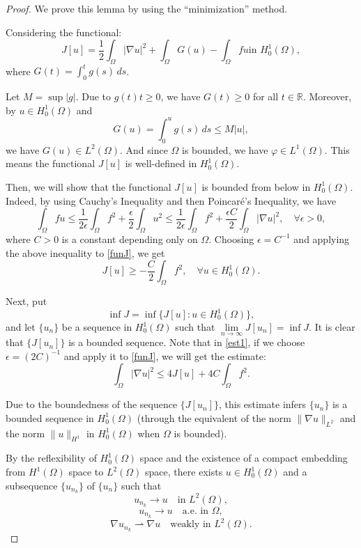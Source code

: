 \documentclass[a4paper, 11pt]{report}
\theoremstyle{definition}\newtheorem*{rmk}{Remark}
\begin{document}
\begin{proof}
We prove this lemma by using the ``minimization'' method.

Considering the functional:
\begin{equation}\label{funJ}
J[u] = \frac{1}{2} \int_{\Omega}|\nabla u|^2 + \int_{\Omega}G(u) - \int_{\Omega}fu  \text{in } H^1_0(\Omega),
\end{equation}
where $G(t) = \int_0^t g(s)\,ds$.

Let $M = \sup |g|$. Due to $g(t)t \ge 0$, we have $G(t)\ge 0$ for all $t \in \mathbb{R}$. Moreover, by $u \in H^1_0(\Omega)$ and
\[
G(u) = \int_0^u g(s)\,ds \le M|u|,
\]
we have $G(u) \in L^2(\Omega)$. And since $\Omega$ is bounded, we have $\varphi \in L^1(\Omega)$. This means the functional $J[u]$ is well-defined in $H^1_0(\Omega)$.

Then, we will show that the functional $J[u]$ is bounded from below in $H^1_0(\Omega)$. Indeed, by using Cauchy's Inequality and then Poincar\'e's Inequality, we have
\begin{equation}\label{est1}
\int_{\Omega}fu \le \frac{1}{2\epsilon}\int_{\Omega}f^2 + \frac{\epsilon}{2}\int_{\Omega}u^2 \le \frac{1}{2\epsilon}\int_{\Omega}f^2 +  \frac{\epsilon C}{2} \int_{\Omega}|\nabla u|^2, \quad \forall \epsilon > 0,
\end{equation}
where $C>0$ is a constant depending only on $\Omega$. Choosing $\epsilon = C^{-1}$ and applying the above inequality to \eqref{funJ}, we get
\[
J[u] \ge - \frac{C}{2}\int_{\Omega}f^2, \quad \forall u \in H^1_0(\Omega).
\]

Next, put
\[
\inf J = \inf \{J[u]: u\in H^1_0(\Omega)\},
\]
and let $\{ u_n\}$ be a sequence in $H^1_0(\Omega)$ such that $\lim\limits_{n\to \infty} J[u_n] = \inf J$. It is clear that $\{J[u_n]\}$ is a bounded sequence. Note that in \eqref{est1}, if we choose $\epsilon = (2C)^{-1}$ and apply it to \eqref{funJ}, we will get the estimate:
\[
\int_{\Omega}|\nabla u|^2 \le 4J[u] + 4C\int_{\Omega}f^2.
\]

Due to the boundedness of the sequence $\{J[u_n]\}$, this estimate infers $\{u_n\}$ is a bounded sequence in $H^1_0(\Omega)$ (through the equivalent of the norm $\| \nabla u \|_{L^2}$ and the norm $\| u \|_{H^1}$ in $H^1_0(\Omega)$ when $\Omega$ is bounded).

By the reflexibility of $H^1_0(\Omega)$ space and the existence of a compact embedding from $H^1(\Omega)$ space to $L^2(\Omega)$ space, there exists $u \in H^1_0(\Omega )$ and a subsequence $\{u_{n_k}\}$ of $\{u_n\}$ such that
\begin{equation}\label{conv1}
u_{n_k} \to u\quad \text{in } L^2(\Omega),
\end{equation}
\begin{equation}\label{conv2}
u_{n_k} \to u \quad \text{a.e.\ in } \Omega,
\end{equation}
\begin{equation}\label{conv3}
\nabla u_{n_k} \rightharpoonup \nabla u \quad \text{weakly in } L^2(\Omega) .
\end{equation}


\end{proof}
\end{document}

